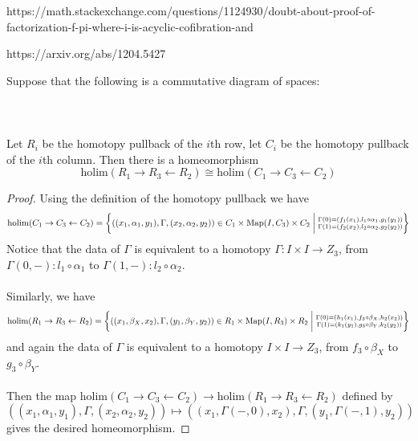 \documentclass[a4paper]{article}
\begin{document}
https://math.stackexchange.com/questions/1124930/doubt-about-proof-of-factorization-f-pi-where-i-is-acyclic-cofibration-and

https://arxiv.org/abs/1204.5427

\begin{prp}{}{} Suppose that the following is a commutative diagram of spaces: \\~\\
\\~\\
Let $R_i$ be the homotopy pullback of the $i$th row, let $C_i$ be the homotopy pullback of the $i$th column. Then there is a homeomorphism $$\text{holim}(R_1\rightarrow R_3\leftarrow R_2)\cong\text{holim}(C_1\rightarrow C_3\leftarrow C_2)$$ \tcbline
\begin{proof}
Using the definition of the homotopy pullback we have $$\text{holim}(C_1\rightarrow C_3\leftarrow C_2)=\left\{((x_1,\alpha_1,y_1),\Gamma,(x_2,\alpha_2,y_2))\in C_1\times\text{Map}(I,C_3)\times C_2\;\bigg{|}\;\substack{\Gamma(0)=(f_1(x_1),l_1\circ\alpha_1,g_1(y_1))\\\Gamma(1)=(f_2(x_2),l_2\circ\alpha_2,g_2(y_2))}\right\}$$ Notice that the data of $\Gamma$ is equivalent to a homotopy $\Gamma:I\times I\to Z_3$, from $\Gamma(0,-):l_1\circ\alpha_1$ to $\Gamma(1,-):l_2\circ\alpha_2$. \\~\\

Similarly, we have $$\text{holim}(R_1\rightarrow R_3\leftarrow R_2)=\left\{((x_1,\beta_X,x_2),\Gamma,(y_1,\beta_Y,y_2))\in R_1\times\text{Map}(I,R_3)\times R_2\;\bigg{|}\;\substack{\Gamma(0)=(h_1(x_1),f_3\circ\beta_X,h_2(x_2))\\\Gamma(1)=(k_1(y_1),g_3\circ\beta_Y,k_2(y_2))}\right\}$$ and again the data of $\Gamma$ is equivalent to a homotopy $I\times I\to Z_3$, from $f_3\circ\beta_X$ to $g_3\circ\beta_Y$. \\~\\

Then the map $\text{holim}(C_1\rightarrow C_3\leftarrow C_2)\to\text{holim}(R_1\rightarrow R_3\leftarrow R_2)$ defined by $$((x_1,\alpha_1,y_1),\Gamma,(x_2,\alpha_2,y_2))\mapsto((x_1,\Gamma(-,0),x_2),\Gamma,(y_1,\Gamma(-,1),y_2))$$ gives the desired homeomorphism. 
\end{proof}
\end{prp}
\end{document}
